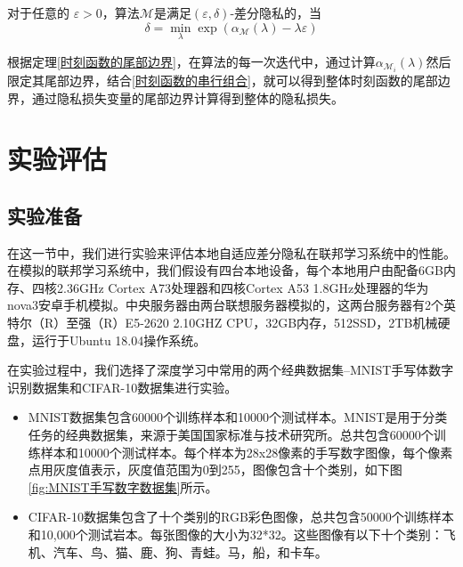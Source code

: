 \begin{theorem}[时刻函数的尾部边界]\label{时刻函数的尾部边界}
对于任意的 $\varepsilon>0$，算法$\mathcal{M}$是满足$(\varepsilon, \delta)$-差分隐私的，当
$$
\delta=\min _{\lambda} \exp \left(\alpha_{\mathcal{M}}(\lambda)-\lambda \varepsilon\right)
$$
\end{theorem}

根据定理\ref{时刻函数的尾部边界}，在算法的每一次迭代中，通过计算$\alpha_{\mathcal{M}_{i}}(\lambda)$然后限定其尾部边界，结合\ref{时刻函数的串行组合}，就可以得到整体时刻函数的尾部边界，通过隐私损失变量的尾部边界计算得到整体的隐私损失。


\section{实验评估}
\subsection{实验准备}
在这一节中，我们进行实验来评估本地自适应差分隐私在联邦学习系统中的性能。在模拟的联邦学习系统中，我们假设有四台本地设备，每个本地用户由配备6GB内存、四核2.36GHz Cortex A73处理器和四核Cortex A53 1.8GHz处理器的华为nova3安卓手机模拟。中央服务器由两台联想服务器模拟的，这两台服务器有2个英特尔（R）至强（R）E5-2620 2.10GHZ CPU，32GB内存，512SSD，2TB机械硬盘，运行于Ubuntu 18.04操作系统。

在实验过程中，我们选择了深度学习中常用的两个经典数据集--MNIST手写体数字识别数据集和CIFAR-10数据集进行实验。
\begin{itemize}
\item MNIST数据集包含60000个训练样本和10000个测试样本。MNIST是用于分类任务的经典数据集，来源于美国国家标准与技术研究所。总共包含60000个训练样本和10000个测试样本。每个样本为28x28像素的手写数字图像，每个像素点用灰度值表示，灰度值范围为0到255，图像包含十个类别，如下图\ref{fig:MNIST手写数字数据集}所示。

\item CIFAR-10数据集包含了十个类别的RGB彩色图像，总共包含50000个训练样本和10,000个测试岩本。每张图像的大小为32*32。这些图像有以下十个类别：飞机、汽车、鸟、猫、鹿、狗、青蛙。马，船，和卡车。

\end{itemize}


